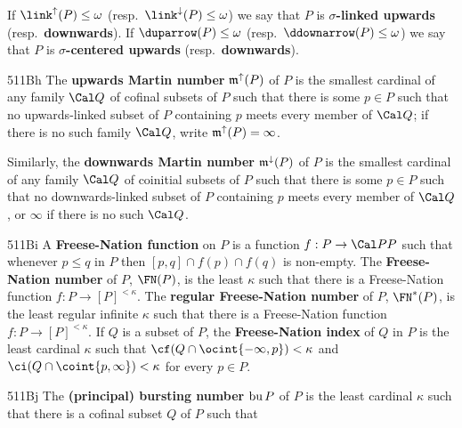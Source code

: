
If $\link^{\uparrow}(P)\le\omega$ (resp.\
$\link^{\downarrow}(P)\le\omega$) we say that $P$ is
{\bf $\sigma$-linked upwards} (resp.\ {\bf downwards}).
If $\duparrow(P)\le\omega$ (resp.\
$\ddownarrow(P)\le\omega$) we say that $P$ is
{\bf $\sigma$-centered upwards} (resp.\ {\bf downwards}).

\spheader 511Bh The {\bf upwards Martin number} $\frak m^{\uparrow}(P)$
of $P$ is the smallest cardinal of any family $\Cal Q$ of cofinal
subsets of $P$ such that there is some $p\in P$ such that no
upwards-linked subset of $P$ containing $p$ meets
every member of $\Cal Q$;  if there is no such family $\Cal Q$, write
$\frak m^{\uparrow}(P)=\infty$.

Similarly, the {\bf downwards Martin number} $\frak m^{\downarrow}(P)$
of $P$ is the smallest cardinal of any family $\Cal Q$ of coinitial
subsets of $P$ such that there is some $p\in P$ such that no
downwards-linked subset of $P$ containing $p$ meets every member
of $\Cal Q$, or $\infty$ if there is no such $\Cal Q$.

\spheader 511Bi A {\bf Freese-Nation function} on $P$ is a function
$f:P\to\Cal PP$ such that whenever $p\le q$ in $P$ then
$[p,q]\cap f(p)\cap f(q)$ is non-empty.   The {\bf Freese-Nation number}
of $P$, $\FN(P)$, is the least $\kappa$ such that there is a
Freese-Nation function $f:P\to[P]^{<\kappa}$.
The {\bf regular Freese-Nation number}
of $P$, $\FN^*(P)$, is the least regular infinite $\kappa$
such that there is a
Freese-Nation function $f:P\to[P]^{<\kappa}$.
If $Q$ is a subset of $P$, the {\bf Freese-Nation index} of $Q$ in $P$
is the least cardinal $\kappa$ such that
$\cf(Q\cap\ocint{-\infty,p})<\kappa$
and $\ci(Q\cap\coint{p,\infty})<\kappa$ for every $p\in P$.

\spheader 511Bj The {\bf (principal) bursting number} $\mathop{\text{bu}} P$ of $P$ is
the least cardinal $\kappa$ such that there is a cofinal subset $Q$ of
$P$ such that


